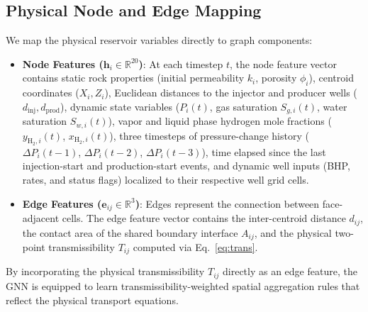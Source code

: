 \documentclass[10pt,twocolumn]{article}
\begin{document}
\subsection{Physical Node and Edge Mapping}
We map the physical reservoir variables directly to graph components:
\begin{itemize}
    \item \textbf{Node Features ($\mathbf{h}_i \in \mathbb{R}^{20}$)}: At each timestep $t$, the node feature vector contains static rock properties (initial permeability $k_i$, porosity $\phi_i$), centroid coordinates ($X_i, Z_i$), Euclidean distances to the injector and producer wells ($d_{\text{inj}}, d_{\text{prod}}$), dynamic state variables ($P_i(t)$, gas saturation $S_{g,i}(t)$, water saturation $S_{w,i}(t)$), vapor and liquid phase hydrogen mole fractions ($y_{\text{H}_2,i}(t)$, $x_{\text{H}_2,i}(t)$), three timesteps of pressure-change history ($\Delta P_i(t-1)$, $\Delta P_i(t-2)$, $\Delta P_i(t-3)$), time elapsed since the last injection-start and production-start events, and dynamic well inputs (BHP, rates, and status flags) localized to their respective well grid cells.
    \item \textbf{Edge Features ($\mathbf{e}_{ij} \in \mathbb{R}^{3}$)}: Edges represent the connection between face-adjacent cells. The edge feature vector contains the inter-centroid distance $d_{ij}$, the contact area of the shared boundary interface $A_{ij}$, and the physical two-point transmissibility $T_{ij}$ computed via Eq.~\ref{eq:trans}.
\end{itemize}

By incorporating the physical transmissibility $T_{ij}$ directly as an edge feature, the GNN is equipped to learn transmissibility-weighted spatial aggregation rules that reflect the physical transport equations.
\end{document}
